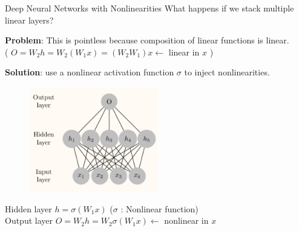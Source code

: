 \begin{frame}[allowframebreaks]

\begin{myconceptblock}{4.2}{Deep Neural Networks with Nonlinearities}
    What happens if we stack multiple linear layers?

    \textbf{Problem}: This is pointless because composition of linear functions is linear.\\
    ( $O = W_2 h = W_2(W_1 x) = (W_2 W_1) x \leftarrow$ linear in $x$ )

    \textbf{Solution}: use a nonlinear activation function $\sigma$ to inject nonlinearities.

    \begin{figure}[H]
        \centering
        \includegraphics[width=0.5\textwidth]{.././assets/4.2.png}
    \end{figure}

    Hidden layer $h=\sigma(W_1 x)$ ($\sigma$ : Nonlinear function)\\
    Output layer $O=W_2 h = W_2 \sigma(W_1 x) \leftarrow$ nonlinear in $x$
\end{myconceptblock}

\end{frame}

